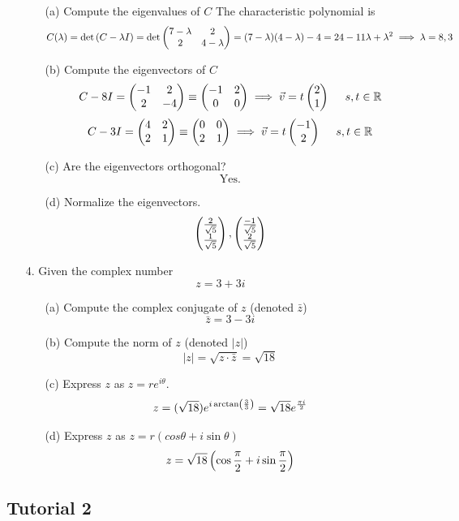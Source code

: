 \documentclass[english, 11pt]{article}
\begin{document}
\begin{itemize}
       \begin{itemize}
         \item[(a)] Compute the eigenvalues of $C$
           The characteristic polynomial is
           \[ C(\lambda) = \det{(C - \lambda I)} = \det \left(\begin{matrix}7 - \lambda & 2 \\ 2 & 4 - \lambda\end{matrix}\right) = (7-\lambda)(4-\lambda) - 4  = 24 -11\lambda + \lambda^2 \implies \lambda = 8, 3 \]
         \item[(b)] Compute the eigenvectors of $C$
           \[ C - 8I = \mtx{-1 & 2 \\ 2 & -4 } \equiv \mtx{-1 & 2 \\ 0 & 0} \implies \vv = t\mtx{2 \\ 1} \ \ \ \ s, t \in \R\]
           \[ C - 3I = \left(\begin{matrix}4 & 2 \\ 2 & 1 \end{matrix}\right) \equiv \left(\begin{matrix}0 & 0 \\ 2 & 1\end{matrix}\right) \implies {\vec{v}} = t\left(\begin{matrix}-1 \\ 2\end{matrix}\right) \ \ \ \ s, t \in {\mathbb{R}}\]
         \item[(c)] Are the eigenvectors orthogonal?
         \[ \mbox{Yes.} \]
         \item[(d)] Normalize the eigenvectors.
         \[ \left(\begin{matrix}\frac{2}{\sqrt{5}} \\ \frac{1}{\sqrt{5}}\end{matrix}\right), \left(\begin{matrix}\frac{-1}{\sqrt{5}} \\ \frac{2}{\sqrt{5}}\end{matrix}\right) \]
       \end{itemize}
       \item[4.] Given the complex number
       \[ z = 3 + 3i \]
       \begin{itemize}
         \item[(a)] Compute the complex conjugate of $z$ (denoted $\bar{z}$)
            \[ \bar{z} = 3 - 3i \]
         \item[(b)] Compute the norm of $z$ (denoted $|z|$)
            \[ |z| = \sqrt{z\cdot \bar{z}} = \sqrt{18} \]
         \item[(c)] Express $z$ as $z = re^{i\theta}$.
            \[ z = (\sqrt{18})e^{i\arctan\left( \frac{3}{3} \right)} = \sqrt{18}e^{\frac{\pi i}{2}} \]
         \item[(d)] Express $z$ as $z = r(cos\theta + i\sin\theta)$
             \[ z = \sqrt{18}\left(\cos \frac{\pi}{2} + i\sin \frac{\pi}{2}\right) \]
       \end{itemize}
     \end{itemize}

     \subsection{Tutorial 2}
\end{document}
